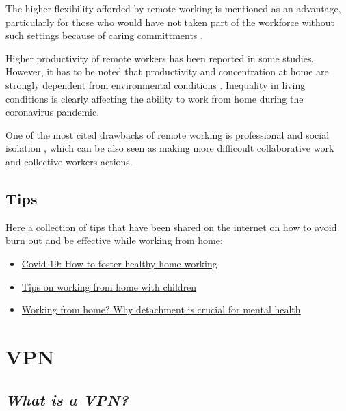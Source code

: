 \documentclass[
]{book}
\providecommand{\tightlist}{%
  \setlength{\itemsep}{0pt}\setlength{\parskip}{0pt}}
\begin{document}
The higher flexibility afforded by remote working is mentioned as an advantage, particularly for those who would have not taken part of the workforce without such settings because of caring committments \citep{olson1983remote}.

Higher productivity of remote workers has been reported in some studies. However, it has to be noted that productivity and concentration at home are strongly dependent from environmental conditions \citep{bailey2002review}. Inequality in living conditions is clearly affecting the ability to work from home during the coronavirus pandemic.

One of the most cited drawbacks of remote working is professional and social isolation \citep{bailey2002review}, which can be also seen as making more difficoult collaborative work and collective workers actions.

\hypertarget{tips}{%
\section{Tips}\label{tips}}

Here a collection of tips that have been shared on the internet on how to avoid burn out and be effective while working from home:

\begin{itemize}
\tightlist
\item
  \href{https://www.ucl.ac.uk/news/2020/apr/covid-19-how-foster-healthy-home-working}{Covid-19: How to foster healthy home working}
\item
  \href{https://www.timeshighereducation.com/blog/tips-working-home-children\#\%20}{Tips on working from home with children}
\item
  \href{https://theconversation.com/working-from-home-why-detachment-is-crucial-for-mental-health-135986}{Working from home? Why detachment is crucial for mental health}
\end{itemize}

\hypertarget{vpn}{%
\chapter{VPN}\label{vpn}}

\hypertarget{what-is-a-vpn}{%
\section{\texorpdfstring{\emph{What is a VPN?}}{What is a VPN?}}\label{what-is-a-vpn}}
\end{document}
